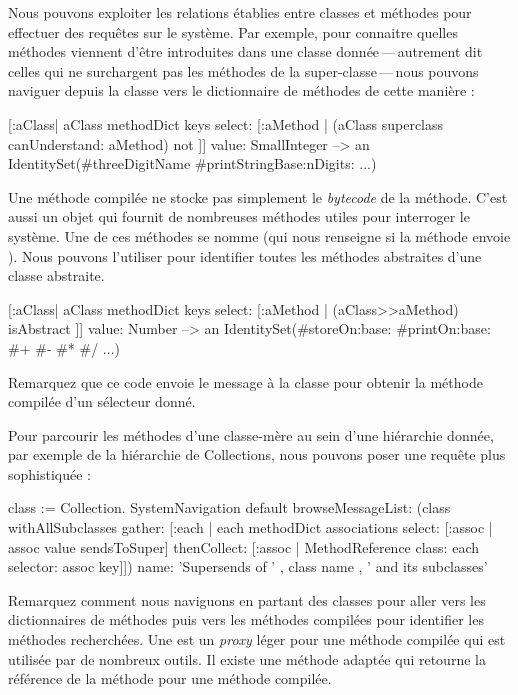 \documentclass[a4paper,10pt,twoside]{book}
\begin{document}
Nous pouvons exploiter les relations établies entre classes et méthodes pour effectuer des requêtes sur le système.
Par exemple, pour connaitre quelles méthodes viennent d'être introduites dans une classe donnée\,---\,autrement dit celles qui ne surchargent pas les méthodes de la super-classe\,---\,nous pouvons naviguer depuis la classe vers le dictionnaire de méthodes de cette manière :

\begin{code}{}
[:aClass| aClass methodDict keys select: [:aMethod |
  (aClass superclass canUnderstand: aMethod) not ]] value: SmallInteger
  --> an IdentitySet(#threeDigitName #printStringBase:nDigits: ...)
\end{code}

Une méthode compilée ne stocke pas simplement le \emph{bytecode} de la méthode.
C'est aussi un objet qui fournit de nombreuses méthodes utiles pour interroger le système. 
Une de ces méthodes se nomme  (qui nous renseigne si la méthode envoie ).
Nous pouvons l'utiliser pour identifier toutes les méthodes abstraites d'une classe abstraite.

\begin{code}{}
[:aClass| aClass methodDict keys select: [:aMethod |
  (aClass>>aMethod) isAbstract ]] value: Number
  --> an IdentitySet(#storeOn:base: #printOn:base: #+ #- #* #/ ...)
\end{code}

Remarquez que ce code envoie le message \ct{>>} à la classe pour obtenir la méthode compilée d'un sélecteur donné.


Pour parcourir les méthodes d'une classe-mère au sein d'une hiérarchie donnée, par exemple de la hiérarchie de Collections, nous pouvons poser une requête plus sophistiquée : 
\begin{code}{}
class := Collection.
SystemNavigation default
  browseMessageList: (class withAllSubclasses gather: [:each |
    each methodDict associations
      select: [:assoc | assoc value sendsToSuper]
      thenCollect: [:assoc | MethodReference class: each selector: assoc key]])
  name: 'Supersends of ' , class name , ' and its subclasses'
\end{code}
Remarquez comment nous naviguons en partant des classes pour aller vers les dictionnaires de méthodes puis vers les méthodes compilées pour identifier les méthodes recherchées. 
Une  est un \emph{proxy} léger pour une méthode compilée qui est utilisée par de nombreux outils.
Il existe une méthode adaptée  qui retourne la référence de la méthode pour une méthode compilée.
\end{document}
